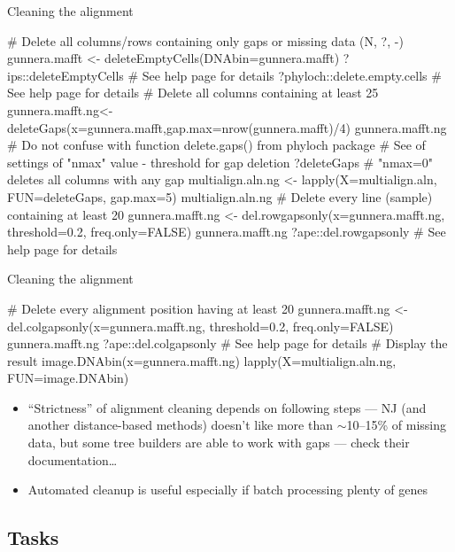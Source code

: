 \documentclass[compress, ucs, xelatex, 11pt, xcolor=svgnames, aspectratio=169,
	hyperref={
		bookmarks=true,
		unicode=true,
		colorlinks=true,
		pdftitle={Molecular data in R},
		plainpages=false,
		pdfauthor={Vojtech Zeisek},
		pdfsubject={Course about phylogeny and evolution in R},
		pdfcreator={XeLaTeX},
		pdfkeywords={R, evolution, phylogeny, molecular data},
		linkcolor=Crimson, %
		anchorcolor=Magenta, %
		citecolor=Magenta, %
		filecolor=Magenta, %
		menucolor=Magenta, %
		urlcolor=DodgerBlue, %
		pdftex},
	url={hyphens, lowtilde} %
	]{beamer}
\begin{document}
\begin{frame}[fragile]{Cleaning the alignment}
	\begin{spluscode}
    # Delete all columns/rows containing only gaps or missing data (N, ?, -)
    gunnera.mafft <- deleteEmptyCells(DNAbin=gunnera.mafft)
    ?ips::deleteEmptyCells # See help page for details
    ?phyloch::delete.empty.cells # See help page for details
    # Delete all columns containing at least 25%
    gunnera.mafft.ng<-deleteGaps(x=gunnera.mafft,gap.max=nrow(gunnera.mafft)/4)
    gunnera.mafft.ng
    # Do not confuse with function delete.gaps() from phyloch package
    # See of settings of "nmax" value - threshold for gap deletion
    ?deleteGaps # "nmax=0" deletes all columns with any gap
    multialign.aln.ng <- lapply(X=multialign.aln, FUN=deleteGaps, gap.max=5)
    multialign.aln.ng
    # Delete every line (sample) containing at least 20%
    gunnera.mafft.ng <- del.rowgapsonly(x=gunnera.mafft.ng, threshold=0.2,
      freq.only=FALSE)
    gunnera.mafft.ng
    ?ape::del.rowgapsonly # See help page for details
	\end{spluscode}
\end{frame}

\begin{frame}[fragile]{Cleaning the alignment}
	\begin{spluscode}
    # Delete every alignment position having at least 20%
    gunnera.mafft.ng <- del.colgapsonly(x=gunnera.mafft.ng, threshold=0.2,
      freq.only=FALSE)
    gunnera.mafft.ng
    ?ape::del.colgapsonly # See help page for details
    # Display the result
    image.DNAbin(x=gunnera.mafft.ng)
    lapply(X=multialign.aln.ng, FUN=image.DNAbin)
	\end{spluscode}
	\vfil
	\begin{itemize}
		\item \enquote{Strictness} of alignment cleaning depends on following steps --- NJ (and another distance-based methods) doesn't like more than $\sim$10--15\% of missing data, but some tree builders are able to work with gaps --- check their documentation\ldots
		\item Automated cleanup is useful especially if batch processing plenty of genes
	\end{itemize}
\end{frame}

\subsection{Tasks}
\end{document}
